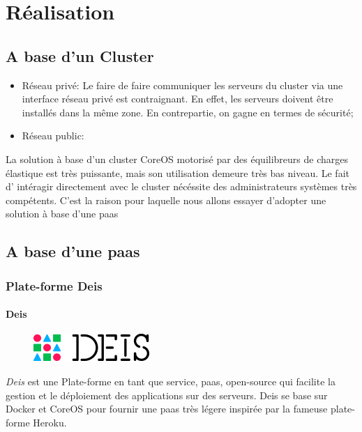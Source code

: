 \chapter{Réalisation}
\begin{onehalfspace}

\newpage

\section{A base d'un Cluster}


\begin{itemize}
	\item Réseau privé: Le faire de faire communiquer les serveurs du cluster via une interface réseau privé est contraignant. En effet, les serveurs doivent être installés dans la même zone. En contrepartie, on gagne en termes de sécurité;
	\item Réseau public: 
\end{itemize}


La solution à base d'un cluster CoreOS motorisé par des équilibreurs de charges élastique est très puissante, mais son utilisation demeure très bas niveau. Le fait d' intéragir directement avec le cluster nécéssite des administrateurs systèmes très compétents. C'est la raison pour laquelle nous allons essayer d'adopter une solution à base d'une \acrshort{paas}


\section{A base d'une \acrshort{paas}}

\subsection{Plate-forme Deis}

\subsubsection*{Deis}

\begin{figure}
\centering
\includegraphics[scale=0.4]{chapitre5/assets/deis}
\end{figure}
\noindent \emph{Deis} est une Plate-forme en tant que service, \acrshort{paas}, open-source qui facilite la gestion et le déploiement des applications sur des serveurs. Deis se base sur Docker et CoreOS pour fournir une \acrshort{paas} très légere inspirée par la fameuse plate-forme Heroku.



\end{onehalfspace}

